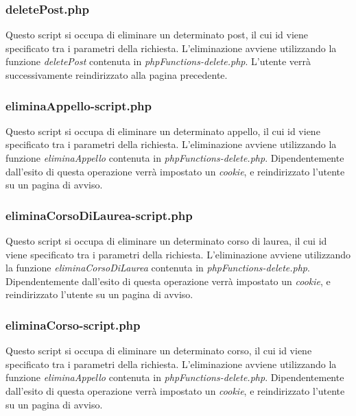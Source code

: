 \documentclass [a4paper,11pt]{book}
\begin{document}
\medskip

\subsubsection{deletePost.php}

Questo script si occupa di eliminare un determinato post, il cui id viene specificato tra i parametri della richiesta. L'eliminazione avviene utilizzando la funzione \emph{deletePost} contenuta in \emph{phpFunctions-delete.php}.
L'utente verrà successivamente reindirizzato alla pagina precedente.

\medskip

\subsubsection{eliminaAppello-script.php}

Questo script si occupa di eliminare un determinato appello, il cui id viene specificato tra i parametri della richiesta. L'eliminazione avviene utilizzando la funzione \emph{eliminaAppello} contenuta in \emph{phpFunctions-delete.php}.
Dipendentemente dall'esito di questa operazione verrà impostato un \emph{cookie}, e reindirizzato l'utente su un pagina di avviso.

\medskip

\subsubsection{eliminaCorsoDiLaurea-script.php}

Questo script si occupa di eliminare un determinato corso di laurea, il cui id viene specificato tra i parametri della richiesta. L'eliminazione avviene utilizzando la funzione \emph{eliminaCorsoDiLaurea} contenuta in \emph{phpFunctions-delete.php}.
Dipendentemente dall'esito di questa operazione verrà impostato un \emph{cookie}, e reindirizzato l'utente su un pagina di avviso.

\medskip

\subsubsection{eliminaCorso-script.php}

Questo script si occupa di eliminare un determinato corso, il cui id viene specificato tra i parametri della richiesta. L'eliminazione avviene utilizzando la funzione \emph{eliminaAppello} contenuta in \emph{phpFunctions-delete.php}.
Dipendentemente dall'esito di questa operazione verrà impostato un \emph{cookie}, e reindirizzato l'utente su un pagina di avviso.
\end{document}
